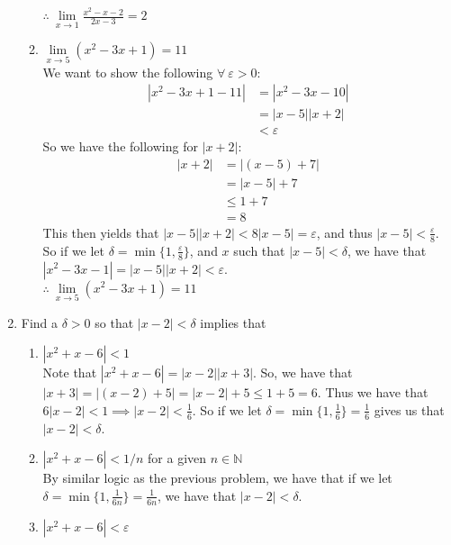 \documentclass[12pt,letterpaper]{article}
\newcommand{\N}{\mathbb{N}}
\theoremstyle{case}
\theoremstyle{definition}
\begin{document}
\begin{enumerate}
\begin{enumerate}
			$\therefore\ \lim\limits_{x \to 1} \frac{x^2-x-2}{2x-3}=2$
			
			\item $\lim\limits_{x \to 5} (x^2-3x+1)=11$ \\
			
			We want to show the following $\forall\ \varepsilon>0$:
			\begin{align*}
				|x^2-3x+1-11| &= |x^2-3x-10| \\
				&=|x-5||x+2| \\
				&<\varepsilon
			\end{align*}
			So we have the following for $|x+2|$:
			\begin{align*}
				|x+2| &= |(x-5)+7| \\
				&= |x-5|+7 \\
				&\leq 1+7 \\
				&= 8
			\end{align*}
			This then yields that $|x-5||x+2|<8|x-5|=\varepsilon$, and thus $|x-5|<\frac{\varepsilon}{8}$.\\
			
			So if we let $\delta=\min \{1, \frac{\varepsilon}{8}\}$, and $x$ such that $|x-5|<\delta$, we have that $|x^2-3x-1|=|x-5||x+2|<\varepsilon$.\\
			
			$\therefore\ \lim\limits_{x \to 5} (x^2-3x+1) = 11$
		\end{enumerate}

	\item Find a $\delta > 0$ so that $|x-2|<\delta$ implies that
		\begin{enumerate}
			\item $|x^2+x-6|<1$\\
			
			Note that $|x^2+x-6|=|x-2||x+3|$. So, we have that $|x+3|=|(x-2)+5|=|x-2|+5\leq 1+5=6$. Thus we have that $6|x-2|<1 \implies |x-2| < \frac{1}{6}$. So if we let $\delta = \min \{1, \frac{1}{6}\}=\frac{1}{6}$ gives us that $|x-2|<\delta$.\\
			
			\item $|x^2+x-6|<1/n$ for a given $n \in \N$\\
			
			By similar logic as the previous problem, we have that if we let $\delta=\min \{1,\frac{1}{6n}\}=\frac{1}{6n}$, we have that $|x-2|<\delta$.
			
			\item $|x^2+x-6|<\varepsilon$\\
			

\end{enumerate}
\end{enumerate}
\end{document}
